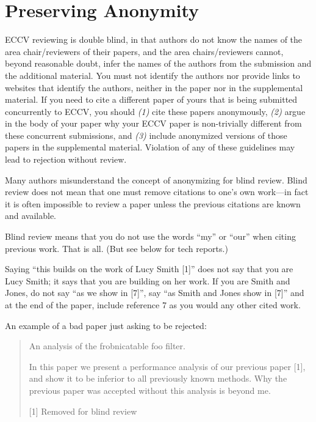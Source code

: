 \documentclass[runningheads]{eccv/llncs}
\begin{document}
\section{Preserving Anonymity}
\label{sec:blind}
ECCV reviewing is double blind, in that authors do not know the names of the area chair/reviewers of their papers, and the area chairs/reviewers cannot, beyond reasonable doubt, infer the names of the authors from the submission and the additional material. 
You must not identify the authors nor provide links to websites that identify the authors, neither in the paper nor in the supplemental material.
If you need to cite a different paper of yours that is being submitted concurrently to ECCV, you should \emph{(1)} cite these papers anonymously, \emph{(2)} argue in the body of your paper why your ECCV paper is non-trivially different from these concurrent submissions, and \emph{(3)} include anonymized versions of those papers in the supplemental material.
Violation of any of these guidelines may lead to rejection without review. 

Many authors misunderstand the concept of anonymizing for blind review.
Blind review does not mean that one must remove citations to one's own work---in fact it is often impossible to review a paper unless the previous citations are known and available.

Blind review means that you do not use the words ``my'' or ``our'' when citing previous work.
That is all.
(But see below for tech reports.)

Saying ``this builds on the work of Lucy Smith [1]'' does not say that you are Lucy Smith;
it says that you are building on her work.
If you are Smith and Jones, do not say ``as we show in [7]'', say ``as Smith and Jones show in [7]'' and at the end of the paper, include reference 7 as you would any other cited work.

An example of a bad paper just asking to be rejected:
\begin{quote}
  \begin{center}
      An analysis of the frobnicatable foo filter.
  \end{center}

   In this paper we present a performance analysis of our previous paper [1], and show it to be inferior to all previously known methods.
   Why the previous paper was accepted without this analysis is beyond me.

   [1] Removed for blind review
\end{quote}
\end{document}
